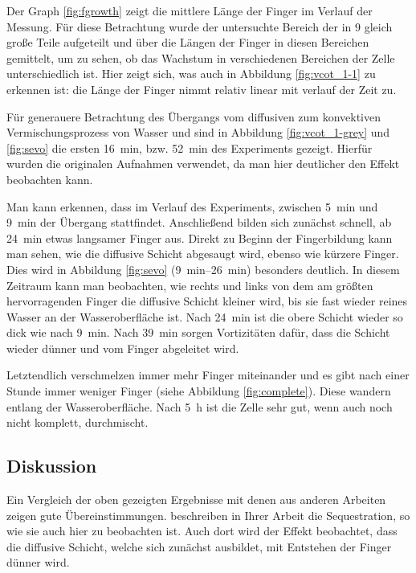 Der Graph \ref{fig:fgrowth} zeigt die mittlere Länge der Finger im Verlauf der Messung. Für diese Betrachtung wurde der untersuchte Bereich der \HSC in 9 gleich große Teile aufgeteilt und über die Längen der Finger in diesen Bereichen gemittelt, um zu sehen, ob das Wachstum in verschiedenen Bereichen der Zelle unterschiedlich ist.
Hier zeigt sich, was auch in Abbildung \ref{fig:vcot_1-1} zu erkennen ist: die Länge der Finger nimmt relativ linear mit verlauf der Zeit zu.

Für generauere Betrachtung des Übergangs vom diffusiven zum konvektiven Vermischungsprozess von Wasser und \COT sind in Abbildung \ref{fig:vcot_1-grey} und \ref{fig:sevo} die ersten \SI{16}{\minute}, bzw. \SI{52}{\minute} des Experiments gezeigt. Hierfür wurden die originalen Aufnahmen verwendet, da man hier deutlicher den Effekt beobachten kann.

Man kann erkennen, dass im Verlauf des Experiments, zwischen \SI{5}{\minute} und \SI{9}{\minute} der Übergang stattfindet. Anschließend bilden sich zunächst schnell, ab \SI{24}{\minute} etwas langsamer Finger aus. Direkt zu Beginn der Fingerbildung kann man sehen, wie die diffusive Schicht abgesaugt wird, ebenso wie kürzere Finger. Dies wird in Abbildung \ref{fig:sevo} (\SIrange{9}{26}{\minute}) besonders deutlich. In diesem Zeitraum kann man beobachten, wie rechts und links von dem am größten hervorragenden Finger die diffusive Schicht kleiner wird, bis sie fast wieder reines Wasser an der Wasseroberfläche ist. Nach \SI{24}{\minute} ist die obere \COT Schicht wieder so dick wie nach \SI{9}{\minute}. Nach \SI{39}{\minute} sorgen Vortizitäten dafür, dass die Schicht wieder dünner und vom Finger abgeleitet wird.

Letztendlich verschmelzen immer mehr Finger miteinander und es gibt nach einer Stunde immer weniger Finger (siehe \zB Abbildung \ref{fig:complete}). Diese wandern entlang der Wasseroberfläche.
Nach \SI{5}{\hour} ist die Zelle sehr gut, wenn auch noch nicht komplett, durchmischt.


\subsection{Diskussion}
\label{res:cot:disk}

Ein Vergleich der oben gezeigten Ergebnisse mit denen aus anderen Arbeiten zeigen gute Übereinstimmungen.
\cite{kneafsy} beschreiben in Ihrer Arbeit die \COTm Sequestration, so wie sie auch hier zu beobachten ist. Auch dort wird der Effekt beobachtet, dass die diffusive Schicht, welche sich zunächst ausbildet, mit Entstehen der Finger dünner wird.

